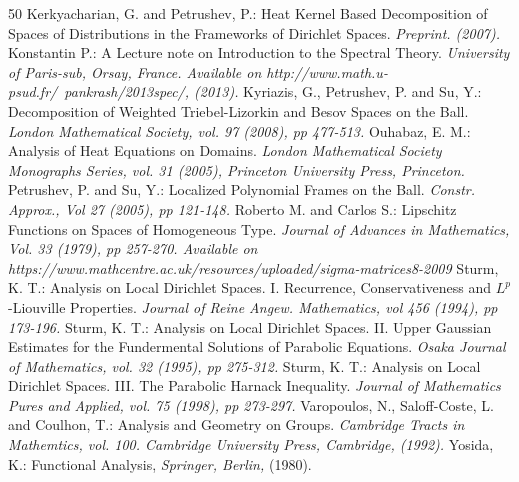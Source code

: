 \documentclass[10pt]{article}
\theoremstyle{definition}
\numberwithin{equation}{section}
\begin{document}
\begin{thebibliography}{50}
 Kerkyacharian, G. and Petrushev, P.: Heat Kernel Based Decomposition of Spaces of Distributions in the Frameworks of Dirichlet Spaces. \textit{Preprint. (2007).}
 Konstantin P.: A Lecture note on Introduction to the Spectral Theory.\emph{ University of Paris-sub, Orsay, France. Available on http://www.math.u-psud.fr/~pankrash/2013spec/,  (2013).}
 Kyriazis, G., Petrushev, P. and Su, Y.: Decomposition of Weighted Triebel-Lizorkin and Besov Spaces on the Ball.  \emph{London Mathematical Society, vol. 97 (2008), pp 477-513.}
 Ouhabaz, E. M.: Analysis of Heat Equations on Domains. \textit{London Mathematical Society Monographs Series, vol. 31 (2005), Princeton University Press, Princeton.}
 Petrushev, P. and Su, Y.: Localized Polynomial Frames on the Ball. \emph{Constr. Approx., Vol 27  (2005), pp 121-148.}
 Roberto M. and Carlos S.: Lipschitz Functions on Spaces of Homogeneous Type. \textit{Journal of Advances in Mathematics, Vol. 33 (1979), pp 257-270. Available on https://www.mathcentre.ac.uk/resources/uploaded/sigma-matrices8-2009}
 Sturm, K. T.: Analysis on Local Dirichlet Spaces. I. Recurrence, Conservativeness and $L^p$-Liouville Properties. \textit{Journal of Reine Angew. Mathematics, vol 456  (1994), pp 173-196.}
 Sturm, K. T.: Analysis on Local Dirichlet Spaces. II. Upper Gaussian Estimates for the Fundermental Solutions of Parabolic Equations. \textit{Osaka Journal of Mathematics, vol. 32  (1995), pp 275-312.}
 Sturm, K. T.: Analysis on Local Dirichlet Spaces. III. The Parabolic Harnack Inequality. \textit{Journal of Mathematics Pures and Applied, vol. 75  (1998), pp 273-297.}
 Varopoulos, N., Saloff-Coste, L. and Coulhon, T.: Analysis and Geometry on Groups. \textit{Cambridge Tracts in Mathemtics, vol. 100. Cambridge University Press, Cambridge, (1992).}
 Yosida, K.: Functional Analysis, \emph{Springer, Berlin,}  (1980).
\end{thebibliography}
\end{document}
